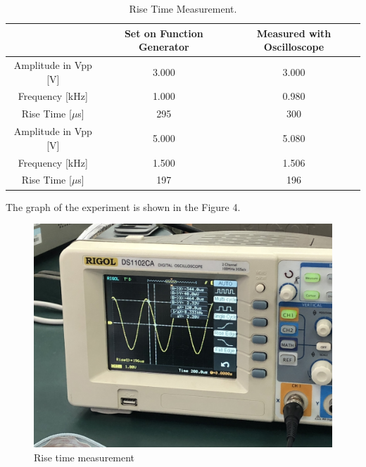 \documentclass{article}
\begin{document}
\begin{table}[H]

\begin{center}

\begin{tabular}{|c|c|c|}

\hline

 & Set on Function Generator & Measured with Oscilloscope \\

\hline

Amplitude in Vpp [V] 	&	3.000	&	3.000	\\

\hline

Frequency [kHz]			&	1.000	&	0.980	\\

\hline

Rise Time [$\mu$s]		&	295	&	300	\\

\hline

Amplitude in Vpp [V] 	&	5.000	&	5.080	\\

\hline

Frequency [kHz]			&	1.500	&	1.506	\\

\hline

Rise Time [$\mu$s]		&	197	&	196	\\

\hline

\end{tabular}

\caption{Rise Time Measurement.}

\label{tab-1}

\end{center}

\end{table}


The graph of the experiment is shown in the Figure 4.
  \begin{figure}[H]
  \centering
  \includegraphics[width=.6\textwidth]{Figure4.jpg}
  \caption{Rise time measurement}
  \label{img} 
\end{figure}
\end{document}
